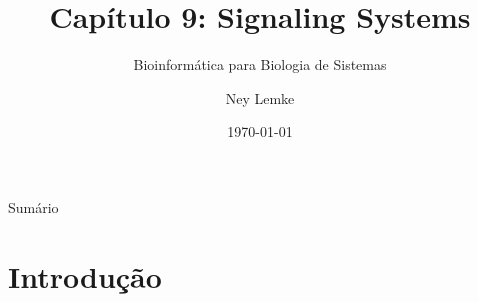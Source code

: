 


\title[Cap. 9: Signaling Systems]{Capítulo 9: Signaling Systems}
\subtitle{Bioinformática para Biologia de Sistemas}
\author{Ney Lemke}
\date{\today}



\begin{frame}
\titlepage
\end{frame}

\begin{frame}{Sumário}
\tableofcontents
\end{frame}

\section{Introdução}

